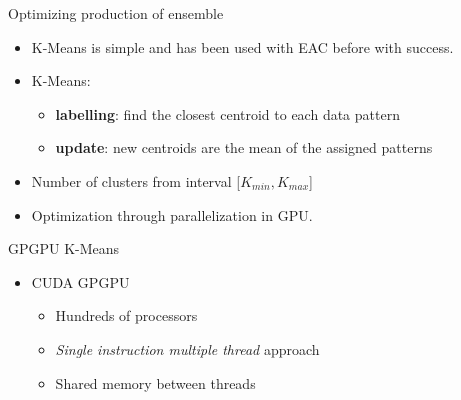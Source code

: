 \begin{frame}{Optimizing production of ensemble}

\begin{itemize}

\item K-Means is simple and has been used with EAC before with success.

\item K-Means:

  \begin{itemize}
  \item \textbf{labelling}: find the closest centroid to each data pattern
  \item \textbf{update}: new centroids are the mean of the assigned patterns

  \end{itemize}

\item Number of clusters from interval [$K_{min},K_{max}$]

\item Optimization through parallelization in GPU.

\end{itemize}

\end{frame}



\begin{frame}{GPGPU K-Means}

\begin{itemize}

\item CUDA GPGPU

  \begin{itemize}
  \item Hundreds of processors

  \item \emph{Single instruction multiple thread} approach

  \item Shared memory between threads

  \end{itemize}
\end{itemize}

\end{frame}



